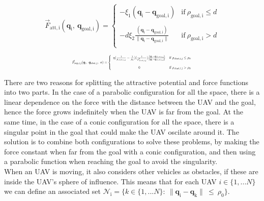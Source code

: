 \documentclass[journal]{IEEEtran}
\newcommand*{\subb}[1]{_{\mathrm{#1}}}
\begin{document}
		\begin{equation} \label{eq:force_att}
		\vec{F}\subb{att, i}(\bm{q}\subb{i}, \ \bm{q}\subb{goal, i}) =  \left\lbrace  {\begin{array}{cc}
			- \xi\subb{1} (\bm{q}\subb{i}-\bm{q}\subb{goal, i})& \textrm{if} \ \rho\subb{goal, i}\leq d \\
			\\
			-d \xi\subb{2} \frac{(\bm{q}\subb{i}-\bm{q}\subb{goal, i})}{\parallel\bm{q}\subb{i}-\bm{q}\subb{goal,i}\parallel}&\textrm{if} \ \rho\subb{goal, i}> d \\
			\end{array} } \right.
		\end{equation}
		
		\begin{equation} \label{eq:force_rep}	
		\resizebox{0.5\textwidth}{!}{ $
			\vec{F}\subb{rep, i,j}(\bm{q}\subb{i}, \ \bm{q}\subb{obst, j},\ a ) =  \left\lbrace  {\begin{array}{cc}
				\eta (\frac{1}{\rho\subb{obst,i,j}}-\frac{1}{\rho\subb{0}})(\frac{1}{\rho\subb{obst,i,j}^2})\frac{(\bm{q}\subb{i}-\bm{q}\subb{obst,i,j})}{\parallel\bm{q}\subb{i}-\bm{q}\subb{obst,i,j} \parallel} & \textrm{if} \ \rho\subb{obst,i,j}\leq \rho\subb{0} \\
				\\
				0 &\textrm{if} \ \rho\subb{obst,i,j}> \rho\subb{0} \\
				\end{array} } \right. $}
		\end{equation}
		
		There are two reasons for splitting the attractive potential and force functions into two parts. In the case of a parabolic configuration for all the space, there is a linear dependence on the force with the distance between the UAV and the goal, hence the force grows indefinitely when the UAV is far from the goal. At the same time, in the case of a conic configuration for all the space, there is a singular point in the goal that could make the UAV oscilate around it. The solution is to combine both configurations to solve these problems, by making the force constant when far from the goal with a conic configuration, and then using a parabolic function when reaching the goal to avoid the singularity.\\
		
		When an UAV is moving, it also considers other vehicles as obstacles, if these are inside the UAV's sphere of influence. This means that for each UAV $i \in \{1,...N\}$ we can define an associated set $\mathcal{N}\subb{i} = \{ k \in \{1,...N\} : \ \parallel \bm{q}\subb{i} - \bm{q}\subb{k} \parallel \ \leq \ \rho\subb{0}\}$. \\
		
\end{document}
